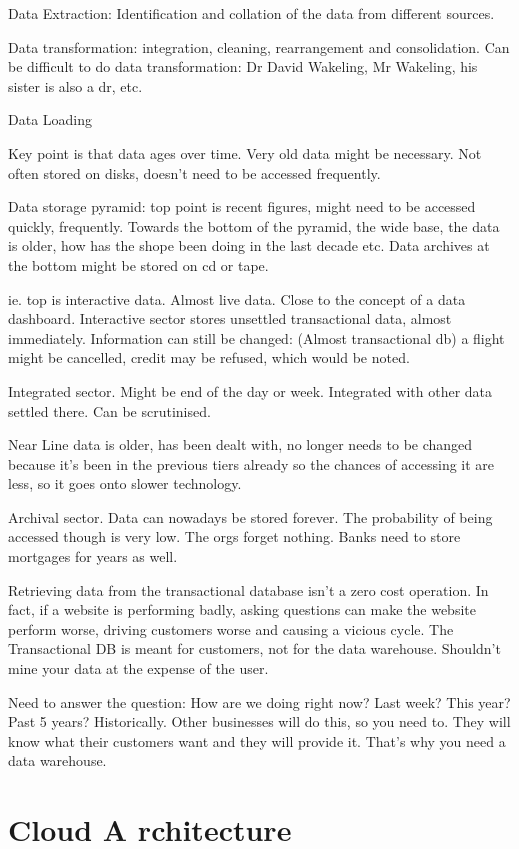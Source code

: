 \documentclass[11pt]{article}
\begin{document}
Data Extraction: Identification and collation of the data from different sources.

Data transformation: integration, cleaning, rearrangement and consolidation. Can be difficult to do data transformation: Dr David Wakeling, Mr Wakeling, his sister is also a dr, etc.

Data Loading

Key point is that data ages over time. Very old data might be necessary. Not often stored on disks, doesn’t need to be accessed frequently.

Data storage pyramid: top point is recent figures, might need to be accessed quickly, frequently. Towards the bottom of the pyramid, the wide base, the data is older, how has the shope been doing in the last decade etc. Data archives at the bottom might be stored on cd or tape.

ie. top is interactive data. Almost live data. Close to the concept of a data dashboard. Interactive sector stores unsettled transactional data, almost immediately. Information can still be changed: (Almost transactional db) a flight might be cancelled, credit may be refused, which would be noted.

Integrated sector. Might be end of the day or week. Integrated with other data settled there. Can be scrutinised.

Near Line data is older, has been dealt with, no longer needs to be changed because it’s been in the previous tiers already so the chances of accessing it are less, so it goes onto slower technology.

Archival sector. Data can nowadays be stored forever. The probability of being accessed though is very low. The orgs forget nothing. Banks need to store mortgages for years as well.

Retrieving data from the transactional database isn’t a zero cost operation. In fact, if a website is performing badly, asking questions can make the website perform worse, driving customers worse and causing a vicious cycle. The Transactional DB is meant for customers, not for the data warehouse. Shouldn’t mine your data at the expense of the user.

Need to answer the question: How are we doing right now? Last week? This year? Past 5 years? Historically. Other businesses will do this, so you need to. They will know what their customers want and they will provide it. That’s why you need a data warehouse.

\section{Cloud A rchitecture}
\end{document}
